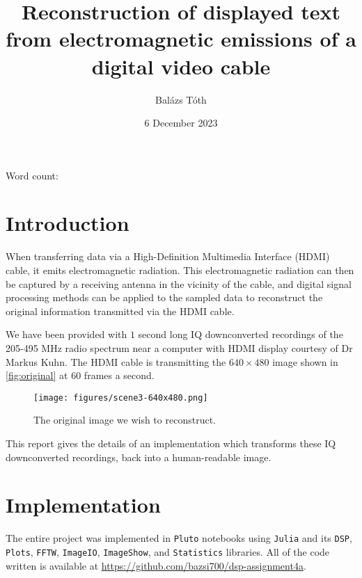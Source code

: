 \documentclass{article}
\title{Reconstruction of displayed text from electromagnetic emissions of a digital video cable}
\author{Balázs Tóth}
\date{6 December 2023}
\begin{document}
\maketitle

\begin{center}
    Word count: 
\end{center}


\section{Introduction}
When transferring data via a High-Definition Multimedia Interface (HDMI) cable, it emits electromagnetic radiation. This electromagnetic radiation can then be captured by a receiving antenna in the vicinity of the cable, and digital signal processing methods can be applied to the sampled data to reconstruct the original information transmitted via the HDMI cable.

We have been provided with $1$ second long IQ downconverted recordings of the 205-495 MHz radio spectrum near a computer with HDMI display courtesy of Dr Markus Kuhn. The HDMI cable is transmitting the $640 \times 480$ image shown in \autoref{fig:original} at $60$ frames a second.

\begin{figure}[htb]
\centering
\texttt{[image: figures/scene3-640x480.png]}
\caption{The original image we wish to reconstruct.}
\label{fig:original}
\end{figure}

This report gives the details of an implementation which transforms these IQ downconverted recordings, back into a human-readable image.


\section{Implementation}
\label{sec:implementation}

The entire project was implemented in \texttt{Pluto} notebooks using \texttt{Julia} and its \texttt{DSP}, \texttt{Plots}, \texttt{FFTW}, \texttt{ImageIO}, \texttt{ImageShow}, and \texttt{Statistics} libraries. All of the code written is available at \url{https://github.com/bazsi700/dsp-assignment4a}.
\end{document}
